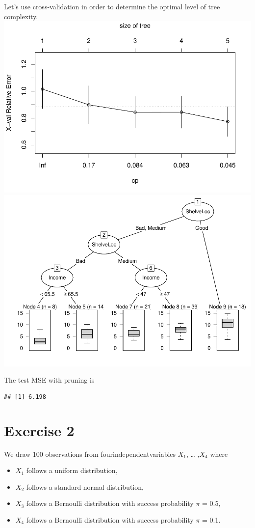 \documentclass[
]{article}
\begin{document}
Let's use cross-validation in order to determine the optimal level of
tree complexity.
\includegraphics{A3_files/figure-latex/unnamed-chunk-7-1.pdf}
\includegraphics{A3_files/figure-latex/unnamed-chunk-7-2.pdf}

The test MSE with pruning is

\begin{verbatim}
## [1] 6.198
\end{verbatim}

\section{Exercise 2}\label{exercise-2}

We draw 100 observations from fourindependentvariables \(X_1\), \ldots{}
,\(X_4\) where

\begin{itemize}
  \item $X_1$ follows a uniform distribution,
  \item $X_2$ follows a standard normal distribution,
  \item $X_3$ follows a Bernoulli distribution with success probability $\pi$ = 0.5,
  \item $X_4$ follows a Bernoulli distribution with success probability $\pi$ = 0.1.
\end{itemize}
\end{document}
